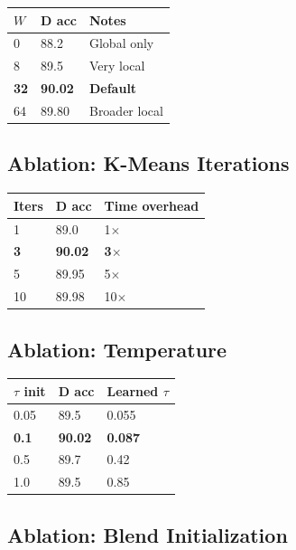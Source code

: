 \begin{table}[H]
\centering
\small
\begin{tabular}{lll}
\toprule
\textbf{$W$} & \textbf{D acc} & \textbf{Notes} \\
\midrule
0 & 88.2 & Global only \\
8 & 89.5 & Very local \\
\textbf{32} & \textbf{90.02} & \textbf{Default} \\
64 & 89.80 & Broader local \\
\bottomrule
\end{tabular}
\end{table}

\subsection{Ablation: K-Means Iterations}

\begin{table}[H]
\centering
\small
\begin{tabular}{lll}
\toprule
\textbf{Iters} & \textbf{D acc} & \textbf{Time overhead} \\
\midrule
1 & 89.0 & 1$\times$ \\
\textbf{3} & \textbf{90.02} & \textbf{3$\times$} \\
5 & 89.95 & 5$\times$ \\
10 & 89.98 & 10$\times$ \\
\bottomrule
\end{tabular}
\end{table}

\subsection{Ablation: Temperature}

\begin{table}[H]
\centering
\small
\begin{tabular}{lll}
\toprule
\textbf{$\tau$ init} & \textbf{D acc} & \textbf{Learned $\tau$} \\
\midrule
0.05 & 89.5 & 0.055 \\
\textbf{0.1} & \textbf{90.02} & \textbf{0.087} \\
0.5 & 89.7 & 0.42 \\
1.0 & 89.5 & 0.85 \\
\bottomrule
\end{tabular}
\end{table}

\subsection{Ablation: Blend Initialization}

